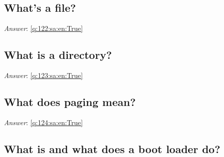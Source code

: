 \documentclass[a4paper,11pt,oneside]{article}
\begin{document}
\begin{sloppypar}
\subsection{What's a file?}

\label{q:122:sa:en:False}

\vspace{2cm}

\noindent\makebox[\textwidth]{\hrulefill}

\vspace{1cm}

\textit{Answer}: \autoref{q:122:sa:en:True}



\subsection{What is a directory?}

\label{q:123:sa:en:False}

\vspace{2cm}

\noindent\makebox[\textwidth]{\hrulefill}

\vspace{1cm}

\textit{Answer}: \autoref{q:123:sa:en:True}



\subsection{What does paging mean?}

\label{q:124:sa:en:False}

\vspace{2cm}

\noindent\makebox[\textwidth]{\hrulefill}

\vspace{1cm}

\textit{Answer}: \autoref{q:124:sa:en:True}



\subsection{What is and what does a boot loader do?}

\label{q:125:sa:en:False}

\vspace{2cm}

\noindent\makebox[\textwidth]{\hrulefill}

\vspace{1cm}


\end{sloppypar}
\end{document}
